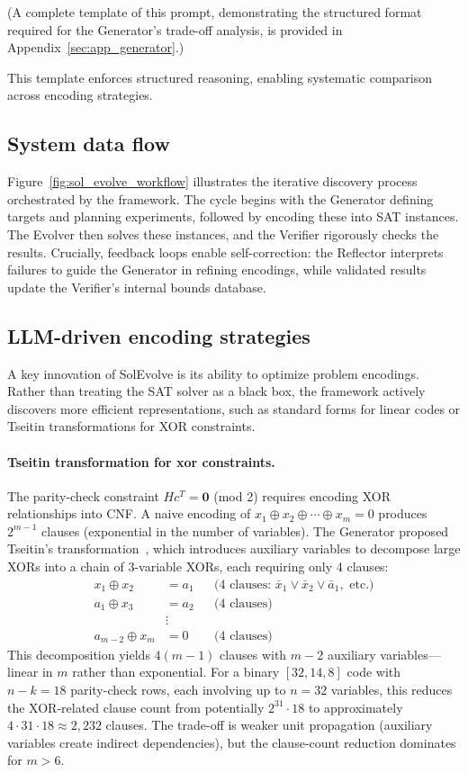 (A complete template of this prompt, demonstrating the structured format required for the Generator's trade-off analysis, is provided in Appendix~\ref{sec:app_generator}.)

\noindent This template enforces structured reasoning, enabling systematic comparison across encoding strategies.

\subsection{System data flow}
Figure~\ref{fig:sol_evolve_workflow} illustrates the iterative discovery process orchestrated by the framework. The cycle begins with the Generator defining targets and planning experiments, followed by encoding these into SAT instances. The Evolver then solves these instances, and the Verifier rigorously checks the results. Crucially, feedback loops enable self-correction: the Reflector interprets failures to guide the Generator in refining encodings, while validated results update the Verifier's internal bounds database.


\subsection{LLM-driven encoding strategies}
A key innovation of SolEvolve is its ability to optimize problem encodings. Rather than treating the SAT solver as a black box, the framework actively discovers more efficient representations, such as standard forms for linear codes or Tseitin transformations for XOR constraints.

\paragraph{Tseitin transformation for xor constraints.} The parity-check constraint $Hc^T = \mathbf{0}$ (mod 2) requires encoding XOR relationships into CNF. A naive encoding of $x_1 \oplus x_2 \oplus \cdots \oplus x_m = 0$ produces $2^{m-1}$ clauses (exponential in the number of variables). The Generator proposed Tseitin's transformation~\cite{Tseitin1983}, which introduces auxiliary variables to decompose large XORs into a chain of 3-variable XORs, each requiring only 4 clauses:
\begin{align*}
x_1 \oplus x_2 &= a_1 && \text{(4 clauses: } \bar{x}_1 \lor \bar{x}_2 \lor \bar{a}_1, \text{ etc.)} \\
a_1 \oplus x_3 &= a_2 && \text{(4 clauses)} \\
&\vdots \\
a_{m-2} \oplus x_m &= 0 && \text{(4 clauses)}
\end{align*}
This decomposition yields $4(m-1)$ clauses with $m-2$ auxiliary variables---linear in $m$ rather than exponential. For a binary $[32,14,8]$ code with $n-k=18$ parity-check rows, each involving up to $n=32$ variables, this reduces the XOR-related clause count from potentially $2^{31} \cdot 18$ to approximately $4 \cdot 31 \cdot 18 \approx 2{,}232$ clauses. The trade-off is weaker unit propagation (auxiliary variables create indirect dependencies), but the clause-count reduction dominates for $m > 6$.

